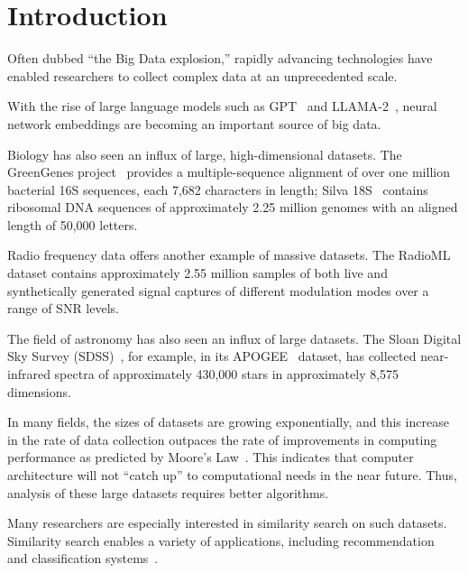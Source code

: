 \section{Introduction}
\label{sec:introduction}

Often dubbed ``the Big Data explosion,'' rapidly advancing technologies have enabled researchers to collect complex data at an unprecedented scale. 

With the rise of large language models such as GPT~\cite{2020arXiv200514165B, OpenAI2023GPT4TR} and LLAMA-2~\cite{Touvron2023Llama2O}, neural network embeddings are becoming an important source of big data.

Biology has also seen an influx of large, high-dimensional datasets.
The GreenGenes project~\cite{desantis2006greengenes} provides a multiple-sequence alignment of over one million bacterial 16S sequences, each 7,682 characters in length;
Silva 18S~\cite{10.1093/nar/gks1219} contains ribosomal DNA sequences of approximately 2.25 million genomes with an aligned length of 50,000 letters.

Radio frequency data offers another example of massive datasets. 
The RadioML~\cite{oshea2018radioml} dataset contains approximately 2.55 million samples of both live and synthetically generated signal captures of different modulation modes over a range of SNR levels.

The field of astronomy has also seen an influx of large datasets.
The Sloan Digital Sky Survey (SDSS)~\cite{blanton2017sdss}, for example, in its APOGEE~\cite{alam2015eleventh} dataset, has collected near-infrared spectra of approximately 430,000 stars in approximately 8,575 dimensions. 

In many fields, the sizes of datasets are growing exponentially, and this increase in the rate of data collection outpaces the rate of improvements in computing performance as predicted by Moore's Law~\cite{brescia2012extracting}.
This indicates that computer architecture will not ``catch up'' to computational needs in the near future.
Thus, analysis of these large datasets requires better algorithms.

Many researchers are especially interested in similarity search on such datasets. 
Similarity search enables a variety of applications, including recommendation~\cite{annoy} and classification systems~\cite{suyanto2022knnclassifier}. 

